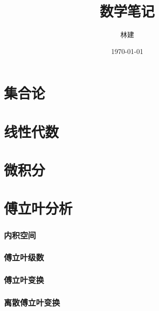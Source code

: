\documentclass[UTF8]{ctexart}
\title{数学笔记}
\author{林建}
\date{\today}
\newcommand{\sectionbreak}{\clearpage}
\begin{document}
\maketitle

\tableofcontents


\sectionbreak

\part{集合论}




\sectionbreak
\part{线性代数}






\sectionbreak
\part{微积分}










\sectionbreak

\part{傅立叶分析}



\section{内积空间}

\section{傅立叶级数}

\section{傅立叶变换}

\section{离散傅立叶变换}


\sectionbreak
\end{document}
